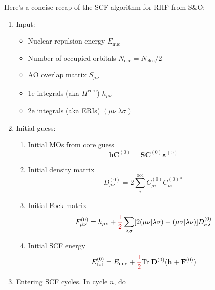 \documentclass[parskip=full]{article}
\newcommand{\myred}[1]{\textcolor{myred}{#1}}
\begin{document}
    Here's a concise recap of the SCF algorithm for RHF from S\&O:
    \begin{enumerate}
        \item Input:
            \begin{itemize}
                \item Nuclear repulsion energy $E_{\textrm{nuc}}$
                \item Number of occupied orbitals $N_{\textrm{occ}} = N_{\textrm{elec}} / 2$
                \item AO overlap matrix $S_{\mu\nu}$
                \item 1e integrals (aka $H^{\textrm{core}}$) $h_{\mu\nu}$
                \item 2e integrals (aka ERIs) $(\mu\nu|\lambda\sigma)$
            \end{itemize}
        \item Initial guess:
        \begin{enumerate}
            \item Initial MOs from core guess
            \begin{equation}
                \mathbf{h} \mathbf{C}^{(0)}
                    = \mathbf{S} \mathbf{C}^{(0)} \bm{\varepsilon}^{(0)}
            \end{equation}
            \item Initial density matrix
            \begin{equation}
                D^{(0)}_{\mu\nu}
                    = 2 \sum_{i}^{\textrm{occ}} C^{(0)}_{\mu i} C^{(0)*}_{\nu i}
            \end{equation}
            \item Initial Fock matrix
            \begin{equation}
                F^{(0)}_{\mu\nu}
                    = h_{\mu\nu} + \myred{\frac{1}{2}}
                    \sum_{\lambda\sigma} [2 (\mu\nu|\lambda\sigma) - (\mu\sigma|\lambda\nu)]
                    D^{(0)}_{\sigma\lambda}
            \end{equation}
            \item Initial SCF energy
            \begin{equation}
                E^{(0)}_{\textrm{tot}}
                    = E_{\textrm{nuc}} + \myred{\frac{1}{2}}
                    \mathrm{Tr}~\mathbf{D}^{(0)} (\mathbf{h} + \mathbf{F}^{(0)})
            \end{equation}
        \end{enumerate}
        \item Entering SCF cycles. In cycle $n$, do

\end{enumerate}
\end{document}
